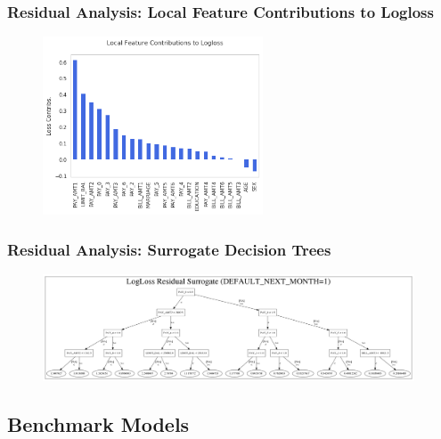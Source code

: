 \documentclass[11pt,
               aspectratio=43,
               hyperref={colorlinks}
               ]{beamer}
\begin{document}
			\begin{frame}
		
				\frametitle{\textbf{Residual Analysis}: Local Feature Contributions to Logloss}
		
				\begin{figure}[htb]
					\begin{center}
						\includegraphics[height=150pt]{img/local.png}
					\end{center}
				\end{figure}	
		
			\end{frame}

			\begin{frame}
		
				\frametitle{\textbf{Residual Analysis}: Surrogate Decision Trees}
		
				\begin{figure}[htb]
					\begin{center}
						\includegraphics[height=90pt]{img/surrogate_dt_1.png}
					\end{center}
				\end{figure}	
		
			\end{frame}
			
		\subsection{Benchmark Models}
\end{document}
